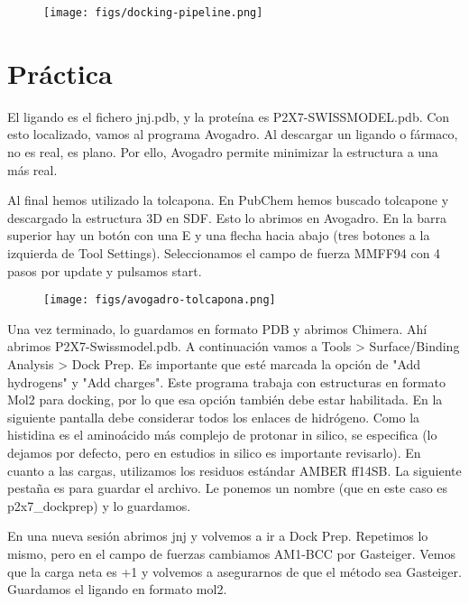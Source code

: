 \begin{figure}[h]
\centering
\texttt{[image: figs/docking-pipeline.png]}
\end{figure}

\section{Práctica}
El ligando es el fichero jnj.pdb, y la proteína es P2X7-SWISSMODEL.pdb. Con esto localizado, vamos al programa Avogadro. Al descargar un ligando o fármaco, no es real, es plano. Por ello, Avogadro permite minimizar la estructura a una más real. 

Al final hemos utilizado la tolcapona. En PubChem hemos buscado tolcapone y descargado la estructura 3D en SDF. Esto lo abrimos en Avogadro. En la barra superior hay un botón con una E y una flecha hacia abajo (tres botones a la izquierda de Tool Settings). Seleccionamos el campo de fuerza MMFF94 con 4 pasos por update y pulsamos start. 

\begin{figure}[h]
\centering
\texttt{[image: figs/avogadro-tolcapona.png]}
\end{figure}

Una vez terminado, lo guardamos en formato PDB y abrimos Chimera. Ahí abrimos P2X7-Swissmodel.pdb. A continuación vamos a Tools > Surface/Binding Analysis > Dock Prep. Es importante que esté marcada la opción de "Add hydrogens" y "Add charges". Este programa trabaja con estructuras en formato Mol2 para docking, por lo que esa opción también debe estar habilitada. En la siguiente pantalla debe considerar todos los enlaces de hidrógeno. Como la histidina es el aminoácido más complejo de protonar in silico, se especifica (lo dejamos por defecto, pero en estudios in silico es importante revisarlo). En cuanto a las cargas, utilizamos los residuos estándar AMBER ff14SB. La siguiente pestaña es para guardar el archivo. Le ponemos un nombre (que en este caso es p2x7\_dockprep) y lo guardamos.

En una nueva sesión abrimos jnj y volvemos a ir a Dock Prep. Repetimos lo mismo, pero en el campo de fuerzas cambiamos AM1-BCC por Gasteiger. Vemos que la carga neta es +1 y volvemos a asegurarnos de que el método sea Gasteiger. Guardamos el ligando en formato mol2. 

